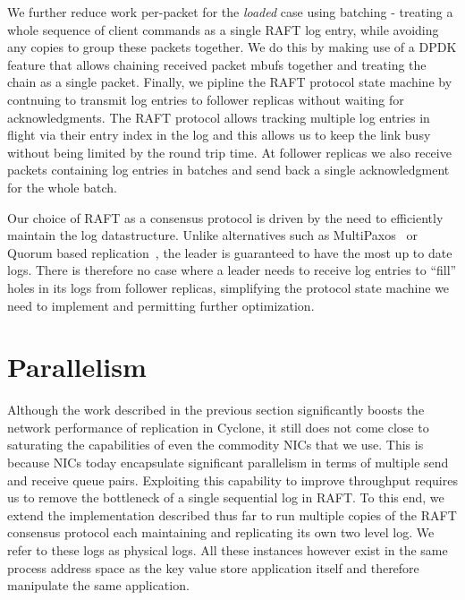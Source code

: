 \documentclass[letterpaper,twocolumn,10pt]{article}
\begin{document}
We further reduce work per-packet for the \emph{loaded} case using
batching - treating a whole sequence of client commands as a single
RAFT log entry, while avoiding any copies to group these packets
together. We do this by making use of a DPDK feature that allows
chaining received packet mbufs together and treating the chain as a
single packet.  Finally, we pipline the RAFT protocol state machine by
contnuing to transmit log entries to follower replicas without waiting
for acknowledgments. The RAFT protocol allows tracking multiple log
entries in flight via their entry index in the log and this allows us
to keep the link busy without being limited by the round trip time.
At follower replicas we also receive packets containing log entries in
batches and send back a single acknowledgment for the whole batch.

Our choice of RAFT as a consensus protocol is driven by the need to
efficiently maintain the log datastructure. Unlike alternatives such
as MultiPaxos~\cite{multipaxos} or Quorum based
replication~\cite{quorum}, the leader is guaranteed to have the most
up to date logs. There is therefore no case where a leader needs to
receive log entries to ``fill'' holes in its logs from follower
replicas, simplifying the protocol state machine we need to implement
and permitting further optimization.

\section{Parallelism}
\label{sec:parallelism}


Although the work described in the previous section significantly boosts the
network performance of replication in Cyclone, it still does not come close to
saturating the capabilities of even the commodity NICs that we use. This is
because NICs today encapsulate significant parallelism in terms of
multiple send and receive queue pairs. Exploiting this capability to improve
throughput requires us to remove the bottleneck of a single sequential log in
RAFT. To this end, we extend the implementation described thus far to run
multiple copies of the RAFT consensus protocol each maintaining and replicating
its own two level log. We refer to these logs as physical logs. All these
instances however exist in the same process address space as the key value store
application itself and therefore manipulate the same application.
\end{document}
